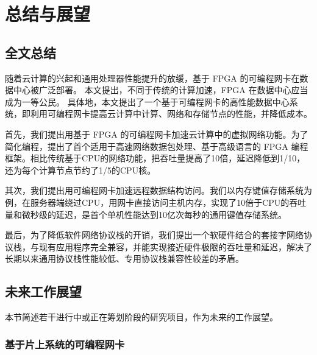 \chapter{总结与展望}

\section{全文总结}

随着云计算的兴起和通用处理器性能提升的放缓，基于 FPGA 的可编程网卡在数据中心被广泛部署。
本文提出，不同于传统的计算加速，FPGA 在数据中心应当成为一等公民。
具体地，本文提出了一个基于可编程网卡的高性能数据中心系统，即利用可编程网卡提高云计算中计算、网络和存储节点的性能，并降低成本。

首先，我们提出用基于 FPGA 的可编程网卡加速云计算中的虚拟网络功能。为了简化编程，提出了首个适用于高速网络数据包处理、基于高级语言的 FPGA 编程框架。相比传统基于CPU的网络功能，把吞吐量提高了10倍，延迟降低到1/10，还为每个计算节点节约了1/5的CPU核。

其次，我们提出用可编程网卡加速远程数据结构访问。我们以内存键值存储系统为例，在服务器端绕过CPU，用网卡直接访问主机内存，实现了10倍于CPU的吞吐量和微秒级的延迟，是首个单机性能达到10亿次每秒的通用键值存储系统。

最后，为了降低软件网络协议栈的开销，我们提出一个软硬件结合的套接字网络协议栈，与现有应用程序完全兼容，并能实现接近硬件极限的吞吐量和延迟，解决了长期以来通用协议栈性能较低、专用协议栈兼容性较差的矛盾。

\section{未来工作展望}

本节简述若干进行中或正在筹划阶段的研究项目，作为未来的工作展望。

\subsection{基于片上系统的可编程网卡}
\label{future:progammable_nic}


